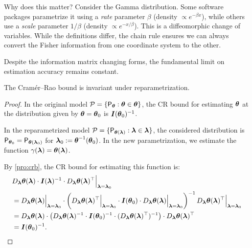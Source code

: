 \begin{ex}
    Why does this matter? Consider the Gamma distribution. Some software packages parametrize it using a \textit{rate} parameter \(\beta\) (density \(\propto e^{-\beta x}\)), while others use a \textit{scale} parameter \(1/\beta\) (density \(\propto e^{-x/\beta}\)). This is a diffeomorphic change of variables. While the definitions differ, the chain rule ensures we can always convert the Fisher information from one coordinate system to the other.
\end{ex}

Despite the information matrix changing forms, the fundamental limit on estimation accuracy remains constant.

\begin{pro}
    The Cram\'er--Rao bound is invariant under reparametrization.
\end{pro}

\begin{proof}
    In the original model \(\mathcal{P} = \{ \mathsf{P}_{\boldsymbol{\theta}} : \boldsymbol{\theta} \in \boldsymbol{\theta} \}\), the CR bound for estimating \(\boldsymbol{\theta}\) at the distribution given by \(\boldsymbol{\theta} = \boldsymbol{\theta}_0\) is \(\boldsymbol{I}(\boldsymbol{\theta}_0)^{-1}\).

    In the reparametrized model \(\mathcal{P}=\{\mathsf{P}_{\boldsymbol{\theta}(\boldsymbol{\lambda})}:\boldsymbol{\lambda}\in\boldsymbol{\lambda}\}\), the considered distribution is \(\mathsf{P}_{\boldsymbol{\theta}_0}=\mathsf{P}_{\boldsymbol{\theta}(\boldsymbol{\lambda}_0)}\) for \(\boldsymbol{\lambda}_0:=\boldsymbol{\theta}^{-1}(\boldsymbol{\theta}_0)\). In the new parametrization, we estimate the function \(\gamma(\boldsymbol{\lambda}) = \boldsymbol{\theta}(\boldsymbol{\lambda})\). 
    
    By \autoref{pro:crb}, the CR bound for estimating this function is:
    \[
    \begin{split} 
    & D_{\boldsymbol{\lambda}}\boldsymbol{\theta}(\boldsymbol{\lambda}) \cdot \boldsymbol{I}(\boldsymbol{\lambda})^{-1} \cdot D_{\boldsymbol{\lambda}}\boldsymbol{\theta}(\boldsymbol{\lambda})^{\top} \Big|_{\boldsymbol{\lambda}=\boldsymbol{\lambda}_{0}} \\ 
    & = D_{\boldsymbol{\lambda}}\boldsymbol{\theta}(\boldsymbol{\lambda}) \Big|_{\boldsymbol{\lambda}=\boldsymbol{\lambda}_{0}} \cdot \left( D_{\boldsymbol{\lambda}}\boldsymbol{\theta}(\boldsymbol{\lambda})^{\top} \Big|_{\boldsymbol{\lambda}=\boldsymbol{\lambda}_{0}} \cdot \boldsymbol{I}(\boldsymbol{\theta}_{0}) \cdot D_{\boldsymbol{\lambda}}\boldsymbol{\theta}(\boldsymbol{\lambda}) \Big|_{\boldsymbol{\lambda}=\boldsymbol{\lambda}_{0}} \right)^{-1} D_{\boldsymbol{\lambda}}\boldsymbol{\theta}(\boldsymbol{\lambda})^{\top} \Big|_{\boldsymbol{\lambda}=\boldsymbol{\lambda}_{0}} \\ 
    & = D_{\boldsymbol{\lambda}}\boldsymbol{\theta}(\boldsymbol{\lambda}) \cdot \left( D_{\boldsymbol{\lambda}}\boldsymbol{\theta}(\boldsymbol{\lambda})^{-1} \cdot \boldsymbol{I}(\boldsymbol{\theta}_{0})^{-1} \cdot (D_{\boldsymbol{\lambda}}\boldsymbol{\theta}(\boldsymbol{\lambda})^{\top})^{-1} \right) \cdot D_{\boldsymbol{\lambda}}\boldsymbol{\theta}(\boldsymbol{\lambda})^{\top} \\
    & = \boldsymbol{I}(\boldsymbol{\theta}_{0})^{-1}. 
    \end{split}
    \]
\end{proof}


